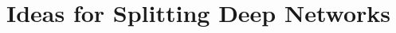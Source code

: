 \documentclass[english,11pt,a4paper]{article}
\title{Ideas for Splitting Deep Networks}
\author{}
\begin{document}
\maketitle

{\small
  
  
}
\end{document}
